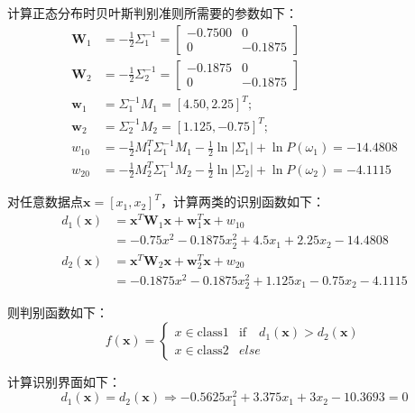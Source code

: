 \documentclass[cn]{elegantbook}
\begin{document}
计算正态分布时贝叶斯判别准则所需要的参数如下：
\begin{equation}
\begin{aligned}
\mathbf{W}_1&=-\frac{1}{2}\Sigma_1^{-1}=\left[\begin{array}{cc}
-0.7500 & 0 \\
0 & -0.1875
\end{array}\right] \\
\mathbf{W}_2&=-\frac{1}{2}\Sigma_2^{-1}=\left[\begin{array}{cc}
-0.1875 & 0 \\
0 & -0.1875
\end{array}\right] \\
\mathbf{w}_1&=\Sigma_1^{-1}M_1=[4.50,2.25]^T; \\
\mathbf{w}_2&=\Sigma_2^{-1}M_2=[1.125,-0.75]^T; \\
w_{10}&=-\frac{1}{2}M_1^T\Sigma_1^{-1}M_1-\frac{1}{2}\ln |\Sigma_1|+\ln P(\omega_1)=-14.4808 \\
w_{20}&=-\frac{1}{2}M_2^T\Sigma_1^{-1}M_2-\frac{1}{2}\ln |\Sigma_2|+\ln P(\omega_2)=-4.1115
\end{aligned}
\end{equation}

对任意数据点$\mathbf{x}=[x_1,x_2]^T$，计算两类的识别函数如下：
\begin{equation}
\begin{aligned}
d_1(\mathbf{x})&=\mathbf{x}^T\mathbf{W}_1\mathbf{x}+\mathbf{w}_1^T\mathbf{x}+w_{10} \\
&=-0.75x^2-0.1875x_2^2+4.5x_1+2.25x_2-14.4808 \\
d_2(\mathbf{x})&=\mathbf{x}^T\mathbf{W}_2\mathbf{x}+\mathbf{w}_2^T\mathbf{x}+w_{20} \\
&=-0.1875x^2-0.1875x_2^2+1.125x_1-0.75x_2-4.1115
\end{aligned}
\end{equation}

则判别函数如下：
\begin{equation}
f(\mathbf{x})=\left\{\begin{array}{cc}
x\in\mbox{class1} & \mbox{if}\quad d_1(\mathbf{x})>d_2(\mathbf{x}) \\
x\in\mbox{class2} & else
\end{array}\right.
\end{equation}

计算识别界面如下：
\begin{equation}
d_1(\mathbf{x})=d_2(\mathbf{x})\Rightarrow -0.5625x_1^2+3.375x_1+3x_2-10.3693=0
\end{equation}
\end{document}
